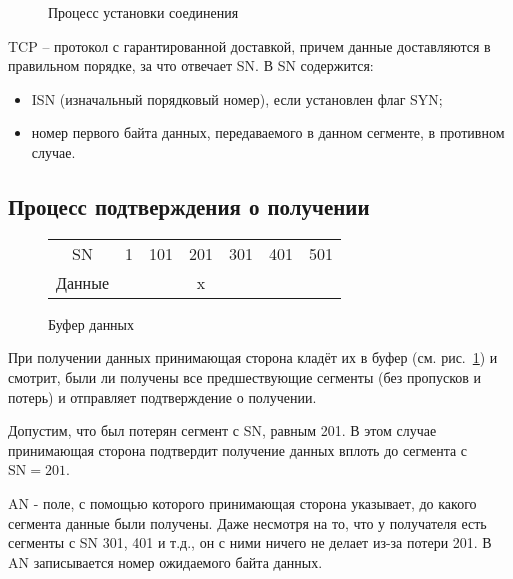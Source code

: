 \begin{figure}[h!]
	\centering
	\caption{Процесс установки соединения}
\end{figure}

TCP -- протокол с гарантированной доставкой, причем данные доставляются в правильном порядке, за что отвечает SN. В SN содержится:
\begin{itemize}
	\item ISN (изначальный порядковый номер), если установлен флаг SYN;
	\item номер первого байта данных, передаваемого в данном сегменте, в противном случае.
\end{itemize}
\subsection{Процесс подтверждения о получении}
\begin{figure}[h!]
	\centering
	\begin{tabular}{ccccccc}
		SN & 1                     & 101                   & 201                    & 301                   & 401                   & 501                   \\ \cline{2-7} 
		\multicolumn{1}{c|}{Данные} & \multicolumn{1}{c|}{} & \multicolumn{1}{c|}{} & \multicolumn{1}{c|}{x} & \multicolumn{1}{c|}{} & \multicolumn{1}{c|}{} & \multicolumn{1}{c|}{} \\ \cline{2-7} 
	\end{tabular}
	\caption{Буфер данных}
	\label{pic:tcpbuf}
\end{figure}
При получении данных принимающая сторона кладёт их в буфер (см. рис.~\ref{pic:tcpbuf}) и смотрит, были ли получены все предшествующие сегменты (без пропусков и потерь) и отправляет подтверждение о получении.

Допустим, что был потерян сегмент с SN, равным 201. В этом случае принимающая сторона подтвердит получение данных вплоть до сегмента с $\text{SN}=201$.

AN - поле, с помощью которого принимающая сторона указывает, до какого сегмента данные были получены. Даже несмотря на то, что у получателя есть сегменты с SN 301, 401 и т.д., он с ними ничего не делает из-за потери 201. В AN записывается номер ожидаемого байта данных.
